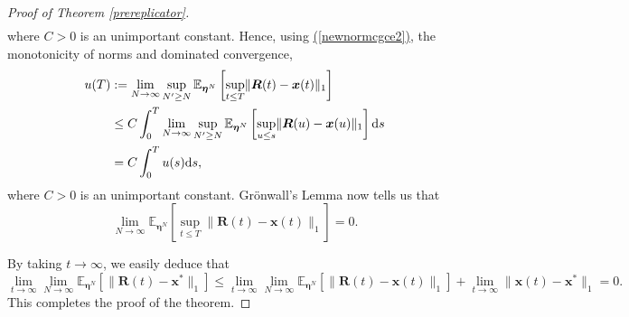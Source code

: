 \documentclass[12pt, leqno]{article}
\renewcommand{\eqref}[1]{\hyperref[#1]{(\ref*{#1})}}
\newcommand*{\norm}[1]{\lVert #1 \rVert}
\newcommand{\dd}{{\mathrm d}}
\begin{document}
\begin{proof}[Proof of Theorem \ref{prereplicator}]
\begin{align}
\label{pregron}
\end{align}
where $C>0$ is an unimportant constant.
Hence, using \eqref{newnormcgce2}, the monotonicity of norms and dominated convergence,
\begin{align*}
u(T)&:=\lim_{N\to\infty}\sup_{N'\geq N} \mathbb{E}_{\bm \eta^N}\left[  \sup_{t\leq T}\norm{\bm R(t)- \bm x(t)}_1 \right]\notag\\
&\leq C\int_0^T\lim_{N\to\infty}\sup_{N'\geq N} 
\mathbb{E}_{\bm \eta^N}\left[  \sup_{u\leq s}\norm{\bm R(u)- \bm x(u)}_1 \right] \dd s\notag\\
& = C\int_0^T u(s)\dd s,
\end{align*}
where $C>0$ is an unimportant constant.
Gr\"onwall's Lemma now tells us that 
\begin{equation}
\lim_{N\to\infty}\mathbb{E}_{\bm \eta^N}\left[ \sup_{t\leq T} \norm{\bm R(t)- \bm x(t)}_1 \right] = 0.
\label{onAt}
\end{equation}


By taking $t\to\infty$, we easily deduce that 
\[
\lim_{t\to\infty}\lim_{N\to\infty}
\mathbb{E}_{\bm \eta^N}\left[  \norm{\bm R(t)- \bm x^* }_1 \right]
\leq \lim_{t\to\infty}\lim_{N\to\infty}\mathbb{E}_{\bm \eta^N}\left[  \norm{\bm R(t)- \bm x(t)}_1 \right]
+\lim_{t\to\infty}\norm{\bm x(t)-\bm x^*}_1 =0.
\]
This completes the proof of the theorem.
\end{proof}
%
\end{document}
